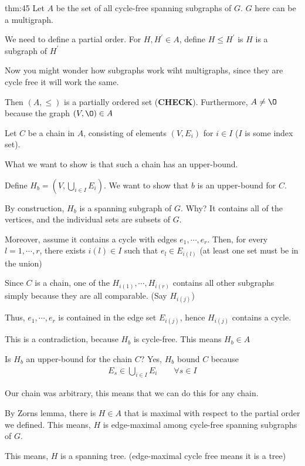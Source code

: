 \begin{prf}[Theorem 4.5]{thm:45}
  Let $A$ be the set of all cycle-free spanning subgraphs of $G$. $G$ here can be a multigraph.
  \par\bigskip
  \noindent We need to define a partial order. For $H, H^{\prime}\in A$, define $H\leq H^{\prime}$ is $H$ is a subgraph of $H^{\prime}$\par
  \noindent Now you might wonder how subgraphs work wiht multigraphs, since they are cycle free it will work the same.
  \par\bigskip
  \noindent Then $(A,\leq)$ is a partially ordered set (\textbf{CHECK}). Furthermore, $A\neq\O$ because the graph $(V,\O)\in A$
  \par\bigskip
  \noindent Let $C$ be a chain in $A$, consisting of elements $(V,E_i)$ for $i\in I$ ($I$ is some index set).\par
  \noindent What we want to show is that such a chain has an upper-bound.
  \par\bigskip
  \noindent Define $H_b = \left(V,\bigcup_{i\in I}E_i\right)$. We want to show that $b$ is an upper-bound for $C$.
  \par\bigskip
  \noindent By construction, $H_b$ is a spanning subgraph of $G$. Why? It contains all of the vertices, and the individual sets are subsets of $G$.
  \par\bigskip
  \noindent Moreover, assume it contains a cycle with edges $e_1,\cdots,e_r$. Then, for every $l = 1,\cdots, r$, there exists $i(l)\in I$ such that $e_l\in E_{i(l)}$ (at least one set must be in the union)
  \par\bigskip
  \noindent Since $C$ is a chain, one of the $H_{i(1)},\cdots,H_{i(r)}$ contains all other subgraphs simply because they are all comparable. (Say $H_{i(j)}$)
  \par\bigskip
  \noindent Thus, $e_1,\cdots, e_r$ is contained in the edge set $E_{i(j)}$, hence $H_{i(j)}$ contains a cycle.
  \par\bigskip
  \noindent This is a contradiction, because $H_b$ is cycle-free. This means $H_b\in A$
  \par\bigskip
  \noindent Is $H_b$ an upper-bound for the chain $C$? Yes, $H_b$ bound $C$ because
  \begin{equation*}
    \begin{gathered}
      E_s\in \bigcup_{i\in I}E_i\qquad\forall s\in I
    \end{gathered}
  \end{equation*}\par
  \noindent Our chain was arbitrary, this means that we can do this for any chain.
  \par\bigskip
  \noindent By Zorns lemma, there is $H\in A$ that is maximal with respect to the partial order we defined. This means, $H$ is edge-maximal among cycle-free spanning subgraphs of $G$.
  \par\bigskip
  \noindent This means, $H$ is a spanning tree. (edge-maximal cycle free means it is a tree)
\end{prf}
